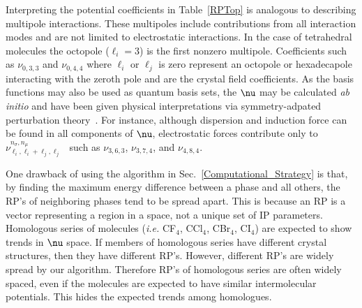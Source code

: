 \documentclass[preprint]{iucr}              %
\newcommand{\mb}[1]{\ensuremath{\mbox{\boldmath $ #1 $}}}
\begin{document}
Interpreting the potential coefficients in Table~\ref{RPTop} is
analogous to describing multipole interactions. These multipoles
include contributions from all interaction modes and are not limited
to electrostatic  interactions. In the case of tetrahedral molecules
the octopole ($\ell_i=3$) is the first nonzero multipole.
Coefficients such as $\nu_{0,3,3}$ and $\nu_{0,4,4}$ where $\ell_i$
or $\ell_j$ is zero represent an octopole or hexadecapole
interacting with the zeroth pole and are the crystal field
coefficients. As the basis functions may also be used as quantum
basis sets, the $\mb{\nu}$ may be calculated \emph{ab initio} and
have been given physical interpretations via symmetry-adpated
perturbation theory~\cite{Avoird94}.  For instance, although
dispersion and induction force can be found in all components of
$\mb{\nu}$, electrostatic forces contribute only to
$\nu^{n_\sigma,n_\mu}_{\ell_i,\ell_i+\ell_j,\ell_j}$~\cite{Stone84}
such as $\nu_{3,6,3}$, $\nu_{3,7,4}$, and $\nu_{4,8,4}$.

One drawback of using the algorithm in
Sec.~\ref{Computational_Strategy} is that, by finding the maximum
energy difference between a phase and all others, the RP's of
neighboring phases tend to be spread apart.  This is because an RP
is a vector representing a region in a space, not a unique set of IP
parameters.  Homologous series of molecules (\emph{i.e.} CF$_4$,
CCl$_4$, CBr$_4$, CI$_4$) are expected to show trends in $\mb{\nu}$
space. If members of homologous series have different crystal
structures, then they have different RP's. However, different RP's
are widely spread by our algorithm. Therefore RP's of homologous
series are often widely spaced, even if the molecules are expected
to have similar intermolecular potentials. This hides the expected
trends among homologues.
\end{document}
